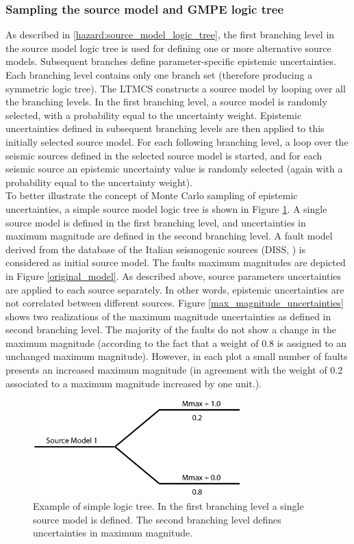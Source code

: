 \subsubsection{Sampling the source model and GMPE logic tree}
As described in \ref{hazard:source_model_logic_tree}, the first branching level in the source model logic tree is used for defining one or more alternative source models. Subsequent branches define parameter-specific epistemic uncertainties. Each branching level contains only one branch set (therefore producing a symmetric logic tree). The LTMCS constructs a source model by looping over all the branching levels. In the first branching level, a source model is randomly selected, with a probability equal to the uncertainty weight. Epistemic uncertainties defined in subsequent branching levels are then applied to this initially selected source model. For each following branching level, a loop over the seismic sources defined in the selected source model is started, and for each seismic source an epistemic uncertainty value is randomly selected (again with a probability equal to the uncertainty weight).\\
To better illustrate the concept of Monte Carlo sampling of epistemic uncertainties, a simple source model logic tree is shown in Figure \ref{simple_logic_tree}. A single source model is defined in the first branching level, and uncertainties in maximum magnitude are defined in the second branching level. A fault model derived from the database of the Italian seismogenic sources (DISS, \cite{basili2008}) is considered as initial source model. The faults maximum magnitudes are depicted in Figure \ref{original_model}. As described above, source parameters uncertainties are applied to each source separately. In other words, epistemic uncertainties are not correlated between different sources. Figure \ref{max_magnitude_uncertainties} shows two realizations of the maximum magnitude uncertainties as defined in second branching level. The majority of the faults do not show a change in the maximum magnitude (according to the fact that a weight of 0.8 is assigned to an unchanged maximum magnitude). However, in each plot a small number of faults presents an increased maximum magnitude (in agreement with the weight of 0.2 associated to a maximum magnitude increased by one unit.).\\
\begin{figure}[!htbp]
\begin{center}
\includegraphics[width=8cm]{./Figures/Part_Hazard/simple_logic_tree.eps}
\caption{Example of simple logic tree. In the first branching level a single source model is defined. The second branching level defines uncertainties in maximum magnitude.}
\label{simple_logic_tree}
\end{center}
\end{figure}

